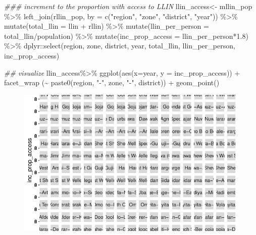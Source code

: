 \documentclass[
  letterpaper,
  DIV=11,
  numbers=noendperiod]{scrreprt}
\newenvironment{Shaded}{\begin{snugshade}}{\end{snugshade}}
\newcommand{\AttributeTok}[1]{\textcolor[rgb]{0.40,0.45,0.13}{#1}}
\newcommand{\DocumentationTok}[1]{\textcolor[rgb]{0.37,0.37,0.37}{\textit{#1}}}
\newcommand{\FloatTok}[1]{\textcolor[rgb]{0.68,0.00,0.00}{#1}}
\newcommand{\FunctionTok}[1]{\textcolor[rgb]{0.28,0.35,0.67}{#1}}
\newcommand{\NormalTok}[1]{\textcolor[rgb]{0.00,0.23,0.31}{#1}}
\newcommand{\OtherTok}[1]{\textcolor[rgb]{0.00,0.23,0.31}{#1}}
\newcommand{\SpecialCharTok}[1]{\textcolor[rgb]{0.37,0.37,0.37}{#1}}
\newcommand{\StringTok}[1]{\textcolor[rgb]{0.13,0.47,0.30}{#1}}
\begin{document}
\begin{Shaded}
\begin{Highlighting}[]
\DocumentationTok{\#\#\# increment to the proportion with access to LLIN}
\NormalTok{llin\_access}\OtherTok{\textless{}{-}}\NormalTok{ mllin\_pop }\SpecialCharTok{\%\textgreater{}\%}
  \FunctionTok{left\_join}\NormalTok{(rllin\_pop, }\AttributeTok{by =} \FunctionTok{c}\NormalTok{(}\StringTok{"region"}\NormalTok{, }\StringTok{"zone"}\NormalTok{, }\StringTok{"district"}\NormalTok{, }\StringTok{"year"}\NormalTok{)) }\SpecialCharTok{\%\textgreater{}\%}
  \FunctionTok{mutate}\NormalTok{(}\AttributeTok{total\_llin =}\NormalTok{ llin }\SpecialCharTok{+}\NormalTok{ rllin) }\SpecialCharTok{\%\textgreater{}\%}
  \FunctionTok{mutate}\NormalTok{(}\AttributeTok{llin\_per\_person =}\NormalTok{ total\_llin}\SpecialCharTok{/}\NormalTok{population) }\SpecialCharTok{\%\textgreater{}\%}
  \FunctionTok{mutate}\NormalTok{(}\AttributeTok{inc\_prop\_access =}\NormalTok{ llin\_per\_person}\SpecialCharTok{*}\FloatTok{1.8}\NormalTok{) }\SpecialCharTok{\%\textgreater{}\%}
\NormalTok{  dplyr}\SpecialCharTok{::}\FunctionTok{select}\NormalTok{(region, zone, district, year, total\_llin, llin\_per\_person, inc\_prop\_access)}

\DocumentationTok{\#\# visualize}
\NormalTok{llin\_access}\SpecialCharTok{\%\textgreater{}\%} 
  \FunctionTok{ggplot}\NormalTok{(}\FunctionTok{aes}\NormalTok{(}\AttributeTok{x=}\NormalTok{year, }\AttributeTok{y =}\NormalTok{ inc\_prop\_access)) }\SpecialCharTok{+}
  \FunctionTok{facet\_wrap}\NormalTok{ (}\SpecialCharTok{\textasciitilde{}} \FunctionTok{paste0}\NormalTok{(region, }\StringTok{"{-}"}\NormalTok{, zone, }\StringTok{"{-}"}\NormalTok{, district)) }\SpecialCharTok{+}
  \FunctionTok{geom\_point}\NormalTok{()}
\end{Highlighting}
\end{Shaded}

\begin{figure}[H]

{\centering \includegraphics{module_01_files/figure-pdf/unnamed-chunk-7-1.pdf}

}

\end{figure}
\end{document}
